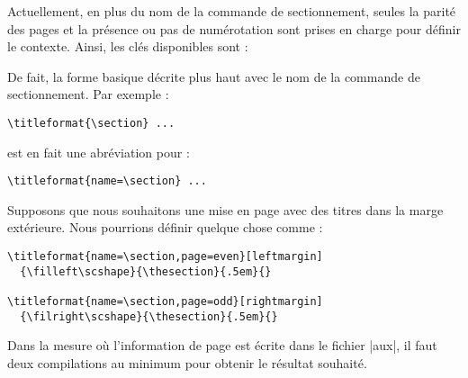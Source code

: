 \documentclass[a4paper]{ltxguide}
\begin{document}
Actuellement, en plus du nom de la commande de sectionnement, seules la parité
des pages et la présence ou pas de numérotation sont prises en charge pour
définir le contexte. Ainsi, les clés disponibles sont :
De fait, la forme basique décrite plus haut avec le nom de la commande de
sectionnement. Par exemple :
\begin{verbatim}
\titleformat{\section} ...
\end{verbatim}
est en fait une abréviation pour :
\begin{verbatim}
\titleformat{name=\section} ...
\end{verbatim}
Supposons que nous souhaitons une mise en page avec des titres dans la marge
extérieure. Nous pourrions définir quelque chose comme :
\begin{verbatim}
\titleformat{name=\section,page=even}[leftmargin]
  {\filleft\scshape}{\thesection}{.5em}{}

\titleformat{name=\section,page=odd}[rightmargin]
  {\filright\scshape}{\thesection}{.5em}{}
\end{verbatim}
Dans la mesure où l'information de page est écrite dans le fichier |aux|, il
faut deux compilations au minimum pour obtenir le résultat souhaité.
\end{document}
